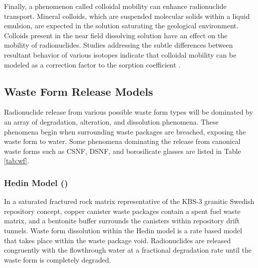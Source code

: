 
Finally, a phenomenon called colloidal mobility can enhance radionuclide 
transport. Mineral colloids, which are suspended molecular solids within a liquid 
emulsion, are expected in the solution saturating the geological environment.
Colloids present in the near field dissolving solution have an effect on the
mobility of radionuclides. Studies addressing the subtle differences between 
resultant behavior of various isotopes indicate that colloidal mobility can be 
modeled as a correction factor to the sorption coefficient 
\cite{bracke_safety_2008}.

\subsection{Waste Form Release Models}

Radionuclide release from various possible waste form types will be dominated by an 
array of degradation, alteration, and dissolution phenomena. These phenomena 
begin when surrounding waste packages are breached, exposing the waste form to 
water. Some phenomena dominating the release from canonical waste forms such as  
\gls{CSNF}, \gls{DSNF}, and borosilicate glasses are listed in Table \ref{tab:wf}.








\subsubsection{Hedin Model (\cite{hedin_integrated_2002})}

In a saturated fractured rock matrix representative of the KBS-3 granitic
Swedish repository concept, copper canister waste packages contain a spent fuel
waste matrix, and a bentonite buffer surrounds the canisters within repository 
drift tunnels. Waste form dissolution within the Hedin model is a rate based
model that takes place within the waste package void. Radionuclides are 
released congruently with the flowthrough water at a fractional degradation 
rate until the waste form is completely degraded.
\cite{hedin_integrated_2002} 

